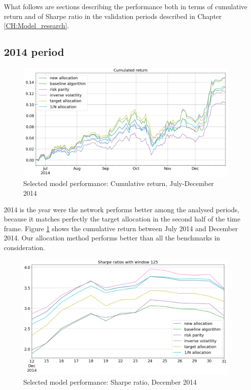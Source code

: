 What follows are sections describing the performance both in terms of cumulative return and of Sharpe ratio in the validation periods described in Chapter \ref{CH:Model_research}.

\subsection{2014 period}

\begin{figure}[H]
	\includegraphics[width=\textwidth]{cap5/selected_cum_ret_2014.png}
	\caption{Selected model performance: Cumulative return, July-December 2014 }
	\label{fig:return_2014}
\end{figure}

2014 is the year were the network performs better among the analysed periods,  because it matches perfectly the target allocation in the second half of the time frame. Figure \ref{fig:return_2014} shows the cumulative return between July 2014 and December 2014. Our allocation method  performs better than all the benchmarks in consideration.\\


\begin{figure}[H]
	\includegraphics[width=\textwidth]{cap5/selected_sharpe_2014.png}
	\caption{Selected model performance: Sharpe ratio, December 2014 }
	\label{fig:sharpe_2014}
\end{figure}

